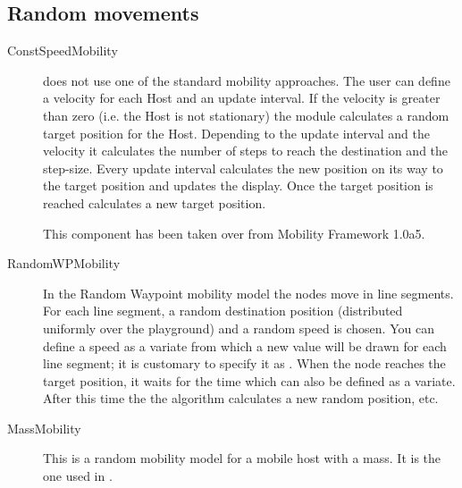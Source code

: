 \subsection{Random movements}

\begin{description}
\item[ConstSpeedMobility]

 does not use one of the standard mobility
approaches. The user can define a velocity for each Host and an update interval. If
the velocity is greater than zero (i.e. the Host is not stationary) the
 module calculates a random target position for the
Host. Depending to the update interval and the velocity it calculates the number of
steps to reach the destination and the step-size. Every update interval
 calculates the new position on its way to the
target position and updates the display. Once the target position is reached
 calculates a new target position.

This component has been taken over from Mobility Framework 1.0a5.


\item[RandomWPMobility]

In the Random Waypoint mobility model the nodes move in line segments. For each
line segment, a random destination position (distributed uniformly over the
playground) and a random speed is chosen. You can define a speed as a variate
from which a new value will be drawn for each line segment; it is customary to
specify it as . When the node reaches the
target position, it waits for the time  which can also be defined as a
variate. After this time the the algorithm calculates a new random position, etc.

\item[MassMobility] 

This is a random mobility model for a mobile host with
a mass. It is the one used in \cite{Perkins99optimizedsmooth}.


\end{description}
